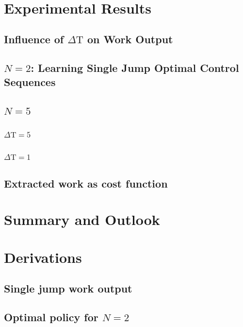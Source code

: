 \chapter{Experimental Results}

\section{Influence of $\Delta \mathrm{T}$ on Work Output} \label{dep_dt}

\section{$N=2$: Learning Single Jump Optimal Control Sequences} \label{n_2_ml}

\section{$N=5$}
\subsection{$\Delta \mathrm{T} = 5$}\label{n_5_ml}



\subsection{$\Delta \mathrm{T} = 1$}


\section{Extracted work as cost function}\label{work_cost}


\chapter{Summary and Outlook}\label{outlook}


\appendix
\chapter{Derivations}
\section{Single jump work output}


\section{Optimal policy for $N=2$} \label{n2_opt_pol}

